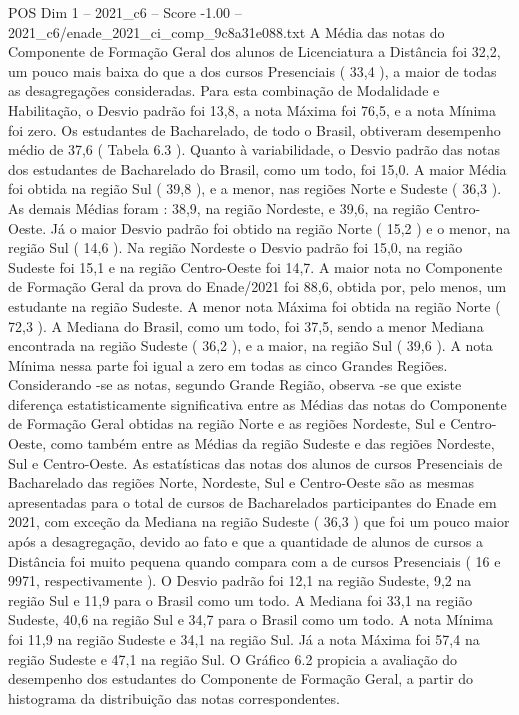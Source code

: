\begin{textsample}{POS Dim 1 – 2021\_c6 – Score -1.00 – 2021\_c6/enade\_2021\_ci\_comp\_9c8a31e088.txt}
A Média das notas do Componente de Formação Geral dos alunos de Licenciatura a Distância foi 32,2, um pouco mais baixa do que a dos cursos Presenciais ( 33,4 ), a maior de todas as desagregações consideradas.
Para esta combinação de Modalidade e Habilitação, o Desvio padrão foi 13,8, a nota Máxima foi 76,5, e a nota Mínima foi zero.
Os estudantes de Bacharelado, de todo o Brasil, obtiveram desempenho médio de 37,6 ( Tabela 6.3 ).
Quanto à variabilidade, o Desvio padrão das notas dos estudantes de Bacharelado do Brasil, como um todo, foi 15,0.
A maior Média foi obtida na região Sul ( 39,8 ), e a menor, nas regiões Norte e Sudeste ( 36,3 ).
As demais Médias foram : 38,9, na região Nordeste, e 39,6, na região Centro-Oeste.
Já o maior Desvio padrão foi obtido na região Norte ( 15,2 ) e o menor, na região Sul ( 14,6 ).
Na região Nordeste o Desvio padrão foi 15,0, na região Sudeste foi 15,1 e na região Centro-Oeste foi 14,7.
A maior nota no Componente de Formação Geral da prova do Enade/2021 foi 88,6, obtida por, pelo menos, um estudante na região Sudeste.
A menor nota Máxima foi obtida na região Norte ( 72,3 ).
A Mediana do Brasil, como um todo, foi 37,5, sendo a menor Mediana encontrada na região Sudeste ( 36,2 ), e a maior, na região Sul ( 39,6 ).
A nota Mínima nessa parte foi igual a zero em todas as cinco Grandes Regiões.
Considerando -se as notas, segundo Grande Região, observa -se que existe diferença estatisticamente significativa entre as Médias das notas do Componente de Formação Geral obtidas na região Norte e as regiões Nordeste, Sul e Centro-Oeste, como também entre as Médias da região Sudeste e das regiões Nordeste, Sul e Centro-Oeste.
As estatísticas das notas dos alunos de cursos Presenciais de Bacharelado das regiões Norte, Nordeste, Sul e Centro-Oeste são as mesmas apresentadas para o total de cursos de Bacharelados participantes do Enade em 2021, com exceção da Mediana na região Sudeste ( 36,3 ) que foi um pouco maior após a desagregação, devido ao fato e que a quantidade de alunos de cursos a Distância foi muito pequena quando compara com a de cursos Presenciais ( 16 e 9971, respectivamente ).
O Desvio padrão foi 12,1 na região Sudeste, 9,2 na região Sul e 11,9 para o Brasil como um todo.
A Mediana foi 33,1 na região Sudeste, 40,6 na região Sul e 34,7 para o Brasil como um todo.
A nota Mínima foi 11,9 na região Sudeste e 34,1 na região Sul.
Já a nota Máxima foi 57,4 na região Sudeste e 47,1 na região Sul.
O Gráfico 6.2 propicia a avaliação do desempenho dos estudantes do Componente de Formação Geral, a partir do histograma da distribuição das notas correspondentes.

\end{textsample}

